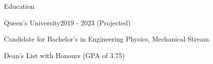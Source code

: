 \documentclass{resume} %
\begin{document}
\begin{rSection}{Education}

\begin{rSubsection}{Queen's University}{2019 - 2023 (Projected)}{}{}
\item Candidate for Bachelor's in Engineering Physics, Mechanical Stream
\item Dean's List with Honours (GPA of 3.75)
\end{rSubsection}
\end{rSection}
\end{document}

